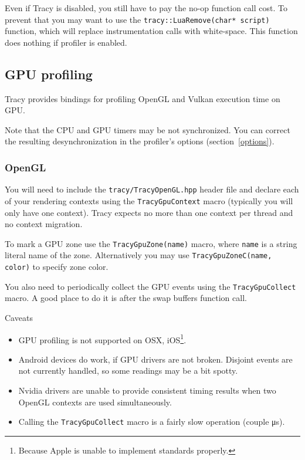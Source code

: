\documentclass[hidelinks,titlepage,a4paper]{article}
\begin{document}
Even if Tracy is disabled, you still have to pay the no-op function call cost. To prevent that you may want to use the \texttt{tracy::LuaRemove(char* script)} function, which will replace instrumentation calls with white-space. This function does nothing if profiler is enabled.

\subsection{GPU profiling}
\label{gpuprofiling}

Tracy provides bindings for profiling OpenGL and Vulkan execution time on GPU.

Note that the CPU and GPU timers may be not synchronized. You can correct the resulting desynchronization in the profiler's options (section~\ref{options}).

\subsubsection{OpenGL}

You will need to include the \texttt{tracy/TracyOpenGL.hpp} header file and declare each of your rendering contexts using the \texttt{TracyGpuContext} macro (typically you will only have one context). Tracy expects no more than one context per thread and no context migration.

To mark a GPU zone use the \texttt{TracyGpuZone(name)} macro, where \texttt{name} is a string literal name of the zone. Alternatively you may use \texttt{TracyGpuZoneC(name, color)} to specify zone color.

You also need to periodically collect the GPU events using the \texttt{TracyGpuCollect} macro. A good place to do it is after the swap buffers function call.

\begin{bclogo}[
noborder=true,
couleur=black!5,
logo=\bcattention
]{Caveats}
\begin{itemize}
\item GPU profiling is not supported on OSX, iOS\footnote{Because Apple is unable to implement standards properly.}.
\item Android devices do work, if GPU drivers are not broken. Disjoint events are not currently handled, so some readings may be a bit spotty.
\item Nvidia drivers are unable to provide consistent timing results when two OpenGL contexts are used simultaneously.
\item Calling the \texttt{TracyGpuCollect} macro is a fairly slow operation (couple \si{\micro\second}).
\end{itemize}
\end{bclogo}
\end{document}
